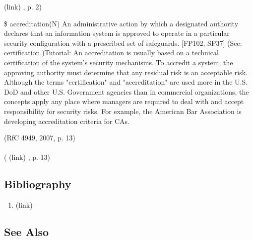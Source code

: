 (link) \href{NIST SP 800-37, 2004 }{ } , p. 2)  \begin{DIC_BlockQuote} \$ accreditation(N) An administrative action by which a designated authority declares that an information system is approved to operate in a particular security configuration with a prescribed set of safeguards. {[}FP102, SP37{]} (See: certification.)Tutorial: An accreditation is usually based on a technical certification of the system's security mechanisms. To accredit a system, the approving authority must determine that any residual risk is an acceptable risk. Although the terms "certification" and "accreditation" are used more in the U.S. DoD and other U.S. Government agencies than in commercial organizations, the concepts apply any place where managers are required to deal with and accept responsibility for security risks. For example, the American Bar Association is developing accreditation criteria for CAs.  \end{DIC_BlockQuote} (RfC 4949, 2007, p. 13)  \paragraph{} (  (link) \href{RfC 4949, 2007 }{ } , p. 13)  \subsection*{Bibliography } \begin{enumerate} \item  (link) \href{RfC 4949, 2007 }{ } \end{enumerate} \subsection*{See Also } 